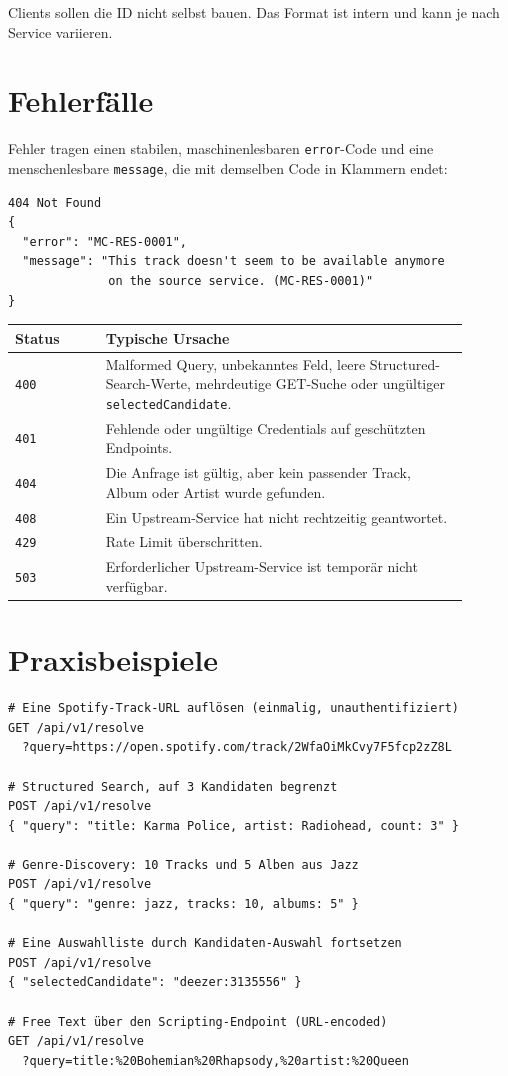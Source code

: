 \documentclass[11pt,a4paper]{article}
\newcommand{\code}[1]{\texttt{#1}}
\begin{document}
Clients sollen die ID nicht selbst bauen. Das Format ist intern und kann je nach Service variieren.

\section{Fehlerfälle}

Fehler tragen einen stabilen, maschinenlesbaren \code{error}-Code und eine menschenlesbare \code{message}, die mit demselben Code in Klammern endet:

\begingroup\small\begin{verbatim}
404 Not Found
{
  "error": "MC-RES-0001",
  "message": "This track doesn't seem to be available anymore
              on the source service. (MC-RES-0001)"
}
\end{verbatim}\endgroup

\begin{longtable}{>{\raggedright\arraybackslash}p{0.18\linewidth}>{\raggedright\arraybackslash}p{0.72\linewidth}}
\textbf{Status} & \textbf{Typische Ursache} \\
\hline
\code{400} & Malformed Query, unbekanntes Feld, leere Structured-Search-Werte, mehrdeutige GET-Suche oder ungültiger \code{selectedCandidate}. \\
\code{401} & Fehlende oder ungültige Credentials auf geschützten Endpoints. \\
\code{404} & Die Anfrage ist gültig, aber kein passender Track, Album oder Artist wurde gefunden. \\
\code{408} & Ein Upstream-Service hat nicht rechtzeitig geantwortet. \\
\code{429} & Rate Limit überschritten. \\
\code{503} & Erforderlicher Upstream-Service ist temporär nicht verfügbar. \\
\end{longtable}

\section{Praxisbeispiele}

\begingroup\small\begin{verbatim}
# Eine Spotify-Track-URL auflösen (einmalig, unauthentifiziert)
GET /api/v1/resolve
  ?query=https://open.spotify.com/track/2WfaOiMkCvy7F5fcp2zZ8L

# Structured Search, auf 3 Kandidaten begrenzt
POST /api/v1/resolve
{ "query": "title: Karma Police, artist: Radiohead, count: 3" }

# Genre-Discovery: 10 Tracks und 5 Alben aus Jazz
POST /api/v1/resolve
{ "query": "genre: jazz, tracks: 10, albums: 5" }

# Eine Auswahlliste durch Kandidaten-Auswahl fortsetzen
POST /api/v1/resolve
{ "selectedCandidate": "deezer:3135556" }

# Free Text über den Scripting-Endpoint (URL-encoded)
GET /api/v1/resolve
  ?query=title:%20Bohemian%20Rhapsody,%20artist:%20Queen
\end{verbatim}\endgroup
\end{document}
